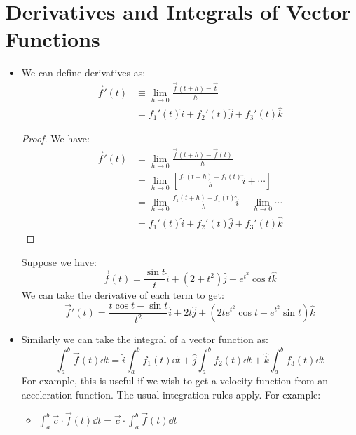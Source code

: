 \section{Derivatives and Integrals of Vector Functions}
\begin{itemize}
    \item We can define derivatives as:
    \begin{align}
        \vec{f}'(t) &\equiv \lim_{h\to 0} \frac{\vec{f}(t+h)-\vec{t}}{h} \\ 
        &= f_1'(t)\hat{i}+f_2'(t)\hat{j}+f_3'(t)\hat{k}
    \end{align}
    \begin{proof}
        We have:
        \begin{align}
            \vec{f}'(t) &= \lim_{h\to 0} \frac{\vec{f}(t+h)-\vec{f}(t)}{h} \\ 
            &= \lim_{h\to 0}\left[\frac{f_1(t+h)-f_1(t)}{h}\hat{i}+\cdots\right] \\ 
            &= \lim_{h\to 0} \frac{f_1(t+h)-f_1(t)}{h}\hat{i}+\lim_{h\to 0} \cdots \\ 
            &= f_1'(t) \hat{i} + f_2'(t)\hat{j} +f_3'(t)\hat{k}
        \end{align}
    \end{proof}
    \begin{example}
        Suppose we have:
        \begin{equation}
            \vec{f}(t) = \frac{\sin t}{t} \hat{i} + (2+t^2)\hat{j}+e^{t^2}\cos t\hat{k}
        \end{equation}
        We can take the derivative of each term to get:
        \begin{equation}
            \vec{f}'(t) = \frac{t\cos t-\sin t}{t^2}\hat{i} + 2t\hat{j} + (2te^{t^2}\cos t - e^{t^2}\sin t)\hat{k}
        \end{equation}
    \end{example}
    \item Similarly we can take the integral of a vector function as:
    \begin{equation}
        \int_a^b \vec{f}(t) \dd{t} = \hat{i}\int_a^b f_1(t) \dd{t} + \hat{j} \int_a^b f_2(t) \dd{t} + \hat{k}\int_a^b f_3(t) \dd{t}
    \end{equation}
    For example, this is useful if we wish to get a velocity function from an acceleration function. The usual integration rules apply. For example:
    \begin{itemize}
        \item $\int_a^b \vec{c} \cdot \vec{f}(t) \dd{t} = \vec{c} \cdot \int_a^b \vec{f}(t) \dd{t}$

\end{itemize}
\end{itemize}
